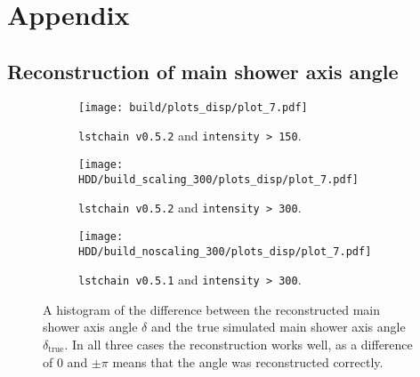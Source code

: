 \chapter{Appendix}

\section{Reconstruction of main shower axis angle}
\begin{figure}
    \centering
    \begin{subfigure}{0.49\textwidth}
        \centering
        \texttt{[image: build/plots\_disp/plot\_7.pdf]}
        \caption{\texttt{lstchain v0.5.2} and \texttt{intensity > 150}.}
        \label{fig:newMC_150}
    \end{subfigure}
    \hfill
    \begin{subfigure}{0.49\textwidth}
        \centering
        \texttt{[image: HDD/build\_scaling\_300/plots\_disp/plot\_7.pdf]}
        \caption{\texttt{lstchain v0.5.2} and \texttt{intensity > 300}.}
        \label{fig:newMC_300}
    \end{subfigure}
    \newline\vfill
    \begin{subfigure}{0.49\textwidth}
        \centering
        \texttt{[image: HDD/build\_noscaling\_300/plots\_disp/plot\_7.pdf]}
        \caption{\texttt{lstchain v0.5.1} and \texttt{intensity > 300}.}
        \label{fig:newMC_300}
    \end{subfigure}
    \caption{A histogram of the difference between the reconstructed main shower axis angle $\delta$ and the true simulated main shower axis angle $\delta_\text{true}$.
        In all three cases the reconstruction works well, as a difference of $\num{0}$ and $\pm \pi$ means that the angle was reconstructed correctly.
    }
    \label{fig:delta_comparison}
\end{figure}




